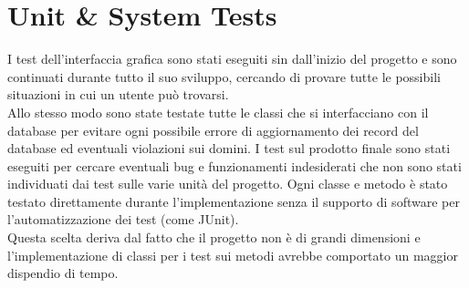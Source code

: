 \documentclass[a4paper,12pt]{report}
\begin{document}
	\chapter*{Unit \& System Tests}
	I test dell'interfaccia grafica sono stati eseguiti sin dall'inizio del progetto e sono continuati durante tutto il suo sviluppo, cercando di provare tutte le possibili situazioni in cui un utente può trovarsi.
	\\
	Allo stesso modo sono state testate tutte le classi che si interfacciano con il database per evitare ogni possibile errore di aggiornamento dei record del database ed eventuali violazioni sui domini.
	\newline
	\newline
	I test sul prodotto finale sono stati eseguiti per cercare eventuali bug e funzionamenti indesiderati che non sono stati individuati dai test sulle varie unità del progetto.
	\newline
	\newline
	Ogni classe e metodo è stato testato direttamente durante l'implementazione senza il supporto di software per l'automatizzazione dei test (come JUnit).
	\\
	Questa scelta deriva dal fatto che il progetto non è di grandi dimensioni e l'implementazione di classi per i test sui metodi avrebbe comportato un maggior dispendio di tempo.

	
	
\end{document}
